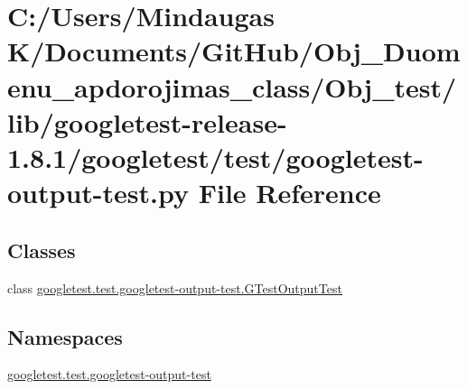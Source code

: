 \hypertarget{_obj__test_2lib_2googletest-release-1_88_81_2googletest_2test_2googletest-output-test_8py}{}\section{C\+:/\+Users/\+Mindaugas K/\+Documents/\+Git\+Hub/\+Obj\+\_\+\+Duomenu\+\_\+apdorojimas\+\_\+class/\+Obj\+\_\+test/lib/googletest-\/release-\/1.8.1/googletest/test/googletest-\/output-\/test.py File Reference}
\label{_obj__test_2lib_2googletest-release-1_88_81_2googletest_2test_2googletest-output-test_8py}
\subsection*{Classes}
\begin{DoxyCompactItemize}
\item 
class \mbox{\hyperlink{classgoogletest_1_1test_1_1googletest-output-test_1_1_g_test_output_test}{googletest.\+test.\+googletest-\/output-\/test.\+G\+Test\+Output\+Test}}
\end{DoxyCompactItemize}
\subsection*{Namespaces}
\begin{DoxyCompactItemize}
\item 
 \mbox{\hyperlink{namespacegoogletest_1_1test_1_1googletest-output-test}{googletest.\+test.\+googletest-\/output-\/test}}
\end{DoxyCompactItemize}
